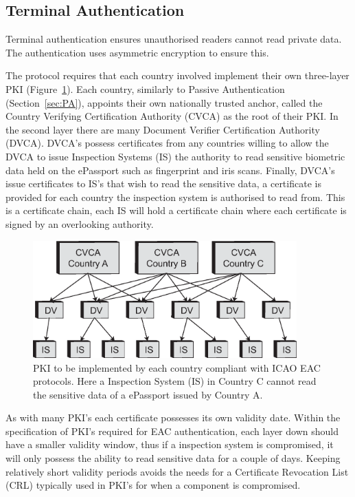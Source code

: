 \documentclass[12pt]{article}
\begin{document}
\subsection{Terminal Authentication}
\label{sec:TA}
Terminal authentication ensures unauthorised readers cannot read private data. The authentication uses asymmetric encryption to ensure this.

The protocol requires that each country involved implement their own three-layer PKI (Figure~\ref{fig:EAC}). Each country, similarly to Passive Authentication (Section~\ref{sec:PA}), appoints their own nationally trusted anchor, called the Country Verifying Certification Authority (CVCA) as the root of their PKI. In the second layer there are many Document Verifier Certification Authority (DVCA). DVCA's possess certificates from any countries willing to allow the DVCA to issue Inspection Systems (IS) the authority to read sensitive biometric data held on the ePassport such as fingerprint and iris scans. Finally, DVCA's issue certificates to IS's that wish to read the sensitive data, a certificate is provided for each country the inspection system is authorised to read from. This is a certificate chain, each IS will hold a certificate chain where each certificate is signed by an overlooking authority.

\begin{figure}
\centering
\includegraphics[width=4in]{EU-EAC.eps}
\caption{PKI to be implemented by each country compliant with ICAO EAC protocols. Here a Inspection System (IS) in Country C cannot read the sensitive data of a ePassport issued by Country A.}
\label{fig:EAC}
\end{figure}

As with many PKI's each certificate possesses its own validity date. Within the specification of PKI's required for EAC authentication, each layer down should have a smaller validity window, thus if a inspection system is compromised, it will only possess the ability to read sensitive data for a couple of days. Keeping relatively short validity periods avoids the needs for a Certificate Revocation List (CRL) typically used in PKI's for when a component is compromised.
\end{document}

